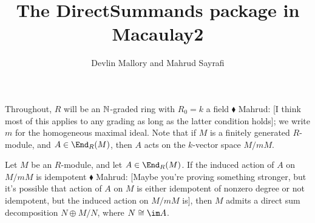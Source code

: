 \documentclass{article}
\title{The DirectSummands package in Macaulay2}
\author{Devlin Mallory and Mahrud Sayrafi}
\numberwithin{equation}{section}
\theoremstyle{theorem}
\numberwithin{thm}{section}
\theoremstyle{definition}
\newcommand{\mahrud}[1]{{\color{ForestGreen} \sf $\blacklozenge$ Mahrud: [#1]}}
\begin{document}
\maketitle

Throughout, $R$ will be an $\mathbb N$-graded ring with $R_0=k$ a field\mahrud{I think most of this applies to any grading as long as the latter condition holds}; we write $m$ for the homogeneous maximal ideal. Note that if $M$ is a finitely generated $R$-module, and $A\in \End_R(M)$, then $A$ acts on the $k$-vector space $M/mM$.

\begin{lem}
  Let $M$ be an $R$-module, and let $A\in\End_R(M)$. If the induced action of $A$ on $M/mM$ is idempotent\mahrud{Maybe you're proving something stronger, but it's possible that action of $A$ on $M$ is either idempotent of nonzero degree or not idempotent, but the induced action on $M/mM$ is}, then $M$ admits a direct sum decomposition $N\oplus M/N$, where $N\cong \im A$.
\end{lem}
\end{document}
